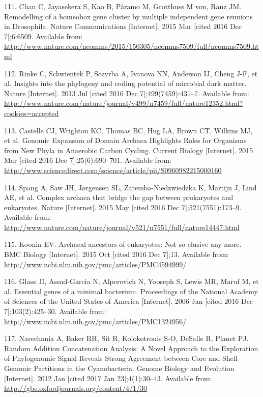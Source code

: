 \documentclass[12pt,twoside]{reedthesis}
\begin{document}
  \hypertarget{ref-chan_remodelling_2015}{}
  111. Chan C, Jayasekera S, Kao B, Páramo M, Grotthuss M von, Ranz JM.
  Remodelling of a homeobox gene cluster by multiple independent gene
  reunions in Drosophila. Nature Communications {[}Internet{]}. 2015 Mar
  {[}cited 2016 Dec 7{]};6:6509. Available from:
  \url{http://www.nature.com/ncomms/2015/150305/ncomms7509/full/ncomms7509.html}
  
  \hypertarget{ref-rinke_insights_2013}{}
  112. Rinke C, Schwientek P, Sczyrba A, Ivanova NN, Anderson IJ, Cheng
  J-F, et al. Insights into the phylogeny and coding potential of
  microbial dark matter. Nature {[}Internet{]}. 2013 Jul {[}cited 2016 Dec
  7{]};499(7459):431--7. Available from:
  \url{http://www.nature.com/nature/journal/v499/n7459/full/nature12352.html?cookies=accepted}
  
  \hypertarget{ref-castelle_genomic_2015}{}
  113. Castelle CJ, Wrighton KC, Thomas BC, Hug LA, Brown CT, Wilkins MJ,
  et al. Genomic Expansion of Domain Archaea Highlights Roles for
  Organisms from New Phyla in Anaerobic Carbon Cycling. Current Biology
  {[}Internet{]}. 2015 Mar {[}cited 2016 Dec 7{]};25(6):690--701.
  Available from:
  \url{http://www.sciencedirect.com/science/article/pii/S0960982215000160}
  
  \hypertarget{ref-spang_complex_2015}{}
  114. Spang A, Saw JH, Jørgensen SL, Zaremba-Niedzwiedzka K, Martijn J,
  Lind AE, et al. Complex archaea that bridge the gap between prokaryotes
  and eukaryotes. Nature {[}Internet{]}. 2015 May {[}cited 2016 Dec
  7{]};521(7551):173--9. Available from:
  \url{http://www.nature.com/nature/journal/v521/n7551/full/nature14447.html}
  
  \hypertarget{ref-koonin_archaeal_2015}{}
  115. Koonin EV. Archaeal ancestors of eukaryotes: Not so elusive any
  more. BMC Biology {[}Internet{]}. 2015 Oct {[}cited 2016 Dec 7{]};13.
  Available from:
  \url{http://www.ncbi.nlm.nih.gov/pmc/articles/PMC4594999/}
  
  \hypertarget{ref-glass_essential_2006}{}
  116. Glass JI, Assad-Garcia N, Alperovich N, Yooseph S, Lewis MR, Maruf
  M, et al. Essential genes of a minimal bacterium. Proceedings of the
  National Academy of Sciences of the United States of America
  {[}Internet{]}. 2006 Jan {[}cited 2016 Dec 7{]};103(2):425--30.
  Available from:
  \url{http://www.ncbi.nlm.nih.gov/pmc/articles/PMC1324956/}
  
  \hypertarget{ref-narechania_random_2012}{}
  117. Narechania A, Baker RH, Sit R, Kolokotronis S-O, DeSalle R, Planet
  PJ. Random Addition Concatenation Analysis: A Novel Approach to the
  Exploration of Phylogenomic Signal Reveals Strong Agreement between Core
  and Shell Genomic Partitions in the Cyanobacteria. Genome Biology and
  Evolution {[}Internet{]}. 2012 Jan {[}cited 2017 Jan 23{]};4(1):30--43.
  Available from: \url{http://gbe.oxfordjournals.org/content/4/1/30}
  
\end{document}
